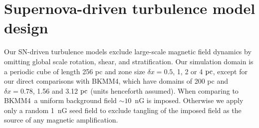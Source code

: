 \documentclass[preprint2]{aastex63}
\newcommand\pc{~ {\rm pc}}
\newcommand\dx{ {\delta x}}
\newcommand\BKM{{\sf BKMM4}}
\newcommand{\fg}[1]{\textcolor{midgreen}{#1}}
\newcommand{\mm}[1]{\textcolor{mypurple}{#1}}
\begin{document}
\section{\mm{Supernova-driven} turbulence model design} \label{sec:model}

\mm{Our} SN-driven turbulence models exclude large-scale
 magnetic field dynamics by \fg{omitting global scale} rotation, shear, and
 stratification.
 Our simulation domain is a periodic cube of length 256 pc and zone size
 $\dx=0.5$, 1, 2 or 4$\pc$\fg{, except for \mm{our} direct comparisons with
 \BKM, \mm{ which have} domains \mm{of} 200 pc and $\dx=0.78$, 1.56 and 3.12$\pc$ (units henceforth
 assumed)}.
 \fg{When comparing \mm{to} \BKM\ a uniform background field $\sim10$~nG is imposed.
 Otherwise we apply only a} random 1~nG seed field \fg{to} exclude tangling of
 \fg{the} imposed field as the source of any magnetic amplification.
\end{document}

